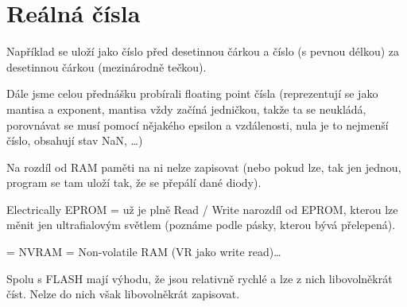 \documentclass[12pt]{article}					%
\begin{document}
\section{Reálná čísla}
    \begin{definice}[Ukládání]
        Například se uloží jako číslo před desetinnou čárkou a číslo (s pevnou délkou) za desetinnou čárkou (mezinárodně tečkou).
    \end{definice}


    \begin{poznamka}
        Dále jsme celou přednášku probírali floating point čísla (reprezentují se jako mantisa a exponent, mantisa vždy začíná jedničkou, takže ta se neukládá, porovnávat se musí pomocí nějakého epsilon a vzdálenosti, nula je to nejmenší číslo, obsahují stav NaN, …)
    \end{poznamka}

    \begin{definice}
        Na rozdíl od RAM paměti na ni nelze zapisovat (nebo pokud lze, tak jen jednou, program se tam uloží tak, že se přepálí dané diody).
    \end{definice}


    \begin{definice}[EEPROM]
        Electrically EPROM = už je plně Read / Write narozdíl od EPROM, kterou lze měnit jen ultrafialovým světlem (poznáme podle pásky, kterou bývá přelepená).

        = NVRAM = Non-volatile RAM (VR jako write read)…

        Spolu s FLASH mají výhodu, že jsou relativně rychlé a lze z nich libovolněkrát číst. Nelze do nich však libovolněkrát zapisovat.
    \end{definice}
\end{document}
